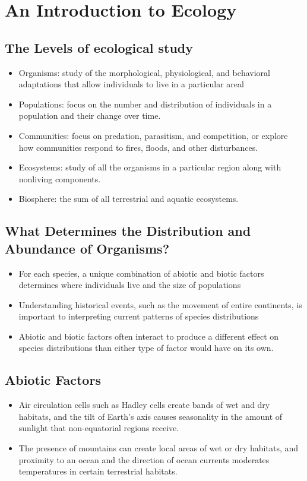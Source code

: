 \documentclass[12pt,a4paper]{article}
\begin{document}
\setcounter{section}{48}
\clearpage
\section{An Introduction to Ecology}
\subsection{The Levels of ecological study}
    \begin{itemize}
        \item Organisms: study of the morphological, physiological, and behavioral adaptations that allow individuals to live in a particular areal
        \item Populations: focus on the number and distribution of individuals in a population and their change over time.
        \item Communities: focus on predation, parasitism, and competition, or explore how communities respond to fires, floods, and other disturbances.
        \item Ecosystems: study of all the organisms in a particular region along with nonliving components.
        \item Biosphere: the sum of all terrestrial and aquatic ecosystems.
    \end{itemize}
\subsection{What Determines the Distribution and Abundance of Organisms?}
    \begin{itemize}
        \item For each species, a unique combination of abiotic and biotic factors determines where individuals live and the size of populations
        \item Understanding historical events, such as the movement of entire continents, is important to interpreting current patterns of species distributions
        \item Abiotic and biotic factors often interact to produce a different effect on species distributions than either type of factor would have on its own.        
    \end{itemize}
\subsection{Abiotic Factors}
    \begin{itemize}
        \item Air circulation cells such as Hadley cells create bands of wet and dry habitats, and the tilt of Earth’s axis causes seasonality in the amount of sunlight that non-equatorial regions receive.
        \item The presence of mountains can create local areas of wet or dry habitats, and proximity to an ocean and the direction of ocean currents moderates temperatures in certain terrestrial habitats.
    \end{itemize}
\end{document}
